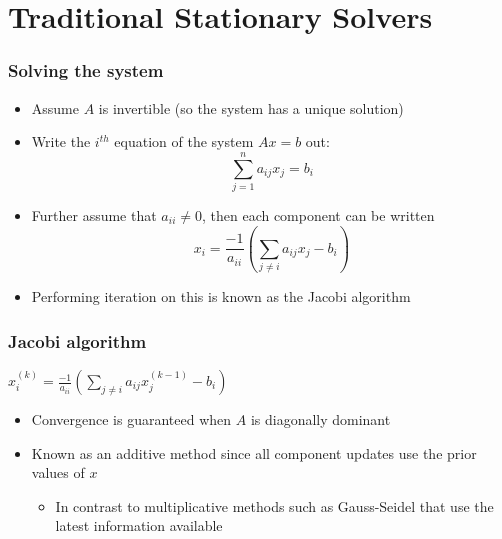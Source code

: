 \documentclass{beamer}
\begin{document}
\section{Traditional Stationary Solvers}

\begin{frame}
	\frametitle{Solving the system}
	\begin{itemize}
		\item Assume $A$ is invertible (so the system has a unique solution)
		\item Write the $i^{th}$ equation of the system $Ax = b$ out:
			\begin{equation}
				\sum_{j=1}^n a_{ij}x_j = b_i
			\end{equation}
		\item Further assume that $a_{ii} \neq 0$, then each component can be written
			\begin{equation}
				x_i = \frac{-1}{a_{ii}}\left( \sum_{j\neq i} a_{ij}x_j - b_i \right)
			\end{equation}
		\item Performing iteration on this is known as the Jacobi algorithm
	\end{itemize}	
\end{frame}

\begin{frame}
	\frametitle{Jacobi algorithm}
	\begin{algorithm}[H]
		\DontPrintSemicolon
		 {
			 {
				$x_i^{(k)} = \frac{-1}{a_{ii}}\left( \sum_{j\neq i} a_{ij}x_j^{(k-1)} - b_i \right)$\;
			}
		}
	\end{algorithm}
	\begin{itemize}
		\item Convergence is guaranteed when $A$ is diagonally dominant
		\item Known as an additive method since all component updates use the prior values of $x$
			\begin{itemize}
				\item In contrast to multiplicative methods such as Gauss-Seidel that use the latest information available
			\end{itemize}
	\end{itemize}
\end{frame}
\end{document}
